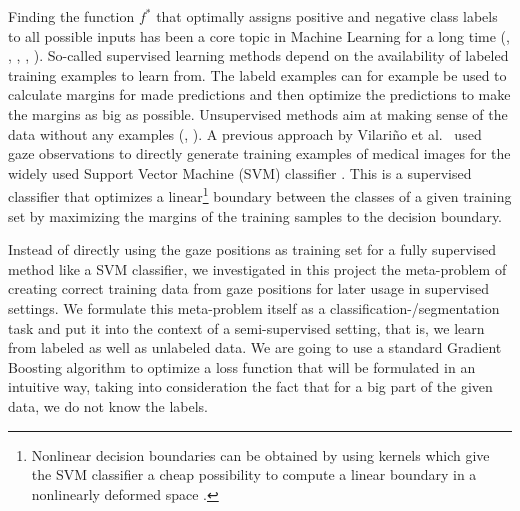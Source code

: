 Finding the function $f^*$ that optimally assigns positive and negative class labels to all possible inputs has been a core topic in Machine Learning for a long time (\cite{cover1967nearest}, \cite{cox1958regression}, \cite{russell1995modern}, \cite{cortes1995support}, \cite{freund1997decision}). 
So-called supervised learning methods depend on the availability of labeled training examples to learn from. The labeld examples can for example be used to calculate margins for made predictions and then optimize the predictions to make the margins as big as possible. Unsupervised methods aim at making sense of the data without any examples (\cite{macqueen1967some}, \cite{cheng1995mean}). 
A previous approach by Vilari\~no et al.\ \cite{vilarino2007automatic} used gaze observations to directly generate training examples of medical images for the widely used Support Vector Machine (SVM) classifier \cite{cortes1995support}. This is a supervised classifier that optimizes a linear\footnote{Nonlinear decision boundaries can be obtained by using kernels which give the SVM classifier a cheap possibility to compute a linear boundary in a nonlinearly deformed space \cite{boser1992training}.} boundary between the classes of a given training set by maximizing the margins of the training samples to the decision boundary. 

Instead of directly using the gaze positions as training set for a fully supervised method like a SVM classifier, we investigated in this project the meta-problem of creating correct training data from gaze positions for later usage in supervised settings. 
We formulate this meta-problem itself as a classification-/segmentation task and put it into the context of a semi-supervised setting, that is, we learn from labeled as well as unlabeled data.
We are going to use a standard Gradient Boosting algorithm to optimize a loss function that will be formulated in an intuitive way, taking into consideration the fact that for a big part of the given data, we do not know the labels.

